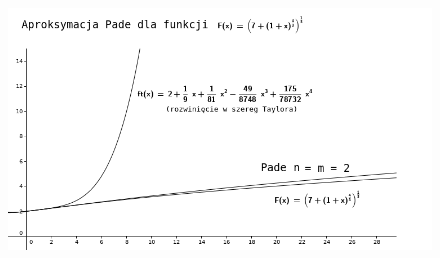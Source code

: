 \begin{frame}
    \begin{figure}
        \includegraphics[height=0.8\textheight]{img/5/pade.png}
    \end{figure}
\end{frame}